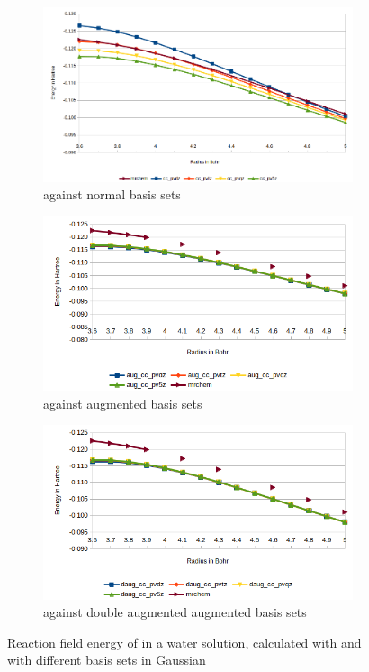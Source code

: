\documentclass[../Thesis.tex]{subfiles}
\begin{document}
\begin{figure}[h!]
  \centering
  \begin{subfigure}[b]{0.75\linewidth}
    \includegraphics[width=\linewidth]{img/Ercyan.png}
    \caption{\mrchem against normal basis sets}
  \end{subfigure}
  \begin{subfigure}[b]{0.75\linewidth}
    \includegraphics[width=\linewidth]{img/Eraugcyan.png}
      \caption{\mrchem against augmented basis sets}
  \end{subfigure}
  \begin{subfigure}[b]{0.75\linewidth}
    \includegraphics[width=\linewidth]{img/Erdaugcyan.png}
    \caption{\mrchem against double augmented augmented basis sets}
  \end{subfigure}
  \caption[Energy plots for ]{Reaction field energy of  in a water solution, calculated with \mrchem
  and with different basis sets in Gaussian}
  \label{fig:cyanEnergyplots}
\end{figure}
\end{document}
